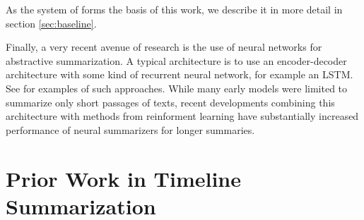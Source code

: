 \documentclass[a4paper,BCOR=10mm]{report}
\numberwithin{lemma}{chapter}
\numberwithin{definition}{chapter}
\begin{document}
As the system of \citet{banerjee} forms the basis of this work, we describe it in more detail in section \ref{sec:baseline}.



%


Finally, a very recent avenue of research is the use of neural networks for abstractive summarization. A typical architecture is to use an encoder-decoder architecture with some kind of recurrent neural network, for example an LSTM. See \citet{nallapati, rush} for examples of such approaches.
While many early models were limited to summarize only short passages of texts, recent developments combining this architecture with methods from reinforment learning have substantially increased performance of neural summarizers for longer summaries. \citep{paulus}



\section{Prior Work in Timeline Summarization} \label{sec:prior-work-tl} 
\end{document}
